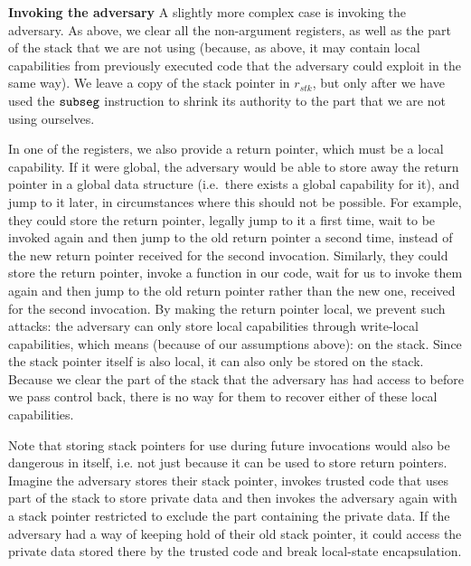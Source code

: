 \documentclass[format=acmsmall, review=false, screen=true]{acmart}
\renewcommand{\sectionname}{Section}
\newcommand\lau[1]{{\color{purple} \sf \footnotesize {LS: #1}}\\}
\renewcommand\lau[1]{}
\newcommand{\var}[1]{\mathit{#1}}
\newcommand{\stk}{\var{stk}}
\newcommand{\zinstr}[1]{\mathtt{#1}}
\newcommand{\threeinstr}[4]{
  \ifthenelse{\equal{#2#3#4}{}}
  {\zinstr{#1}}
  {\zinstr{#1} \; #2 \; #3 \; #4}
}
\newcommand{\subseg}[3]{\threeinstr{subseg}{#1}{#2}{#3}}
\begin{document}
\textbf{Invoking the adversary} A slightly more complex case is invoking the
adversary. As above, we clear all the non-argument registers, as well as the
part of the stack that we are not using (because, as above, it may contain local
capabilities from previously executed code that the adversary could exploit in
the same way). We leave a copy of the stack pointer in $r_\stk$, but only after
we have used the $\subseg{}{}{}$ instruction to shrink its authority to the part
that we are not using ourselves.

In one of the registers, we also provide a return pointer, which must be a local
capability. If it were global, the adversary would be able to store away the
return pointer in a global data structure (i.e.\ there exists a global capability for it), and jump to it later, in
circumstances where this should not be possible. For example, they could store
the return pointer, legally jump to it a first time, wait to be invoked again
and then jump to the old return pointer a second time, instead of the new return
pointer received for the second invocation. Similarly, they could store the
return pointer, invoke a function in our code, wait for us to invoke them again
and then jump to the old return pointer rather than the new one, received for the
second invocation.
%
By making the return pointer local, we prevent such attacks: the adversary can
only store local capabilities through write-local capabilities, which means (because
of our assumptions above): on the stack. Since the stack pointer itself is
also local, it can also only be stored on the stack. Because we clear the part
of the stack that the adversary has had access to before we pass control back,
there is no way for them to recover either of these local capabilities.

Note that storing stack pointers for use during future invocations would also be
dangerous in itself, i.e. not just because it can be used to store return
pointers. Imagine the adversary stores their stack pointer, invokes trusted code
that uses part of the stack to store private data and then invokes the adversary
again with a stack pointer restricted to exclude the part containing the private
data. If the adversary had a way of keeping hold of their old stack pointer, it
could access the private data stored there by the trusted code and break
local-state encapsulation.  
\end{document}
